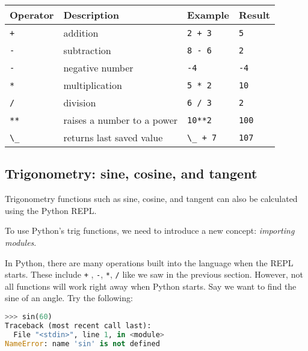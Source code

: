 \documentclass{book}
\newcommand{\passthrough}[1]{#1}
\begin{document}
\begin{longtable}[]{@{}llll@{}}
\toprule
Operator & Description & Example & Result\tabularnewline
\midrule
\endhead
\passthrough{\lstinline!+!} & addition & \passthrough{\lstinline!2 + 3!}
& \passthrough{\lstinline!5!}\tabularnewline
\passthrough{\lstinline!-!} & subtraction &
\passthrough{\lstinline!8 - 6!} &
\passthrough{\lstinline!2!}\tabularnewline
\passthrough{\lstinline!-!} & negative number &
\passthrough{\lstinline!-4!} &
\passthrough{\lstinline!-4!}\tabularnewline
\passthrough{\lstinline!*!} & multiplication &
\passthrough{\lstinline!5 * 2!} &
\passthrough{\lstinline!10!}\tabularnewline
\passthrough{\lstinline!/!} & division & \passthrough{\lstinline!6 / 3!}
& \passthrough{\lstinline!2!}\tabularnewline
\passthrough{\lstinline!**!} & raises a number to a power &
\passthrough{\lstinline!10**2!} &
\passthrough{\lstinline!100!}\tabularnewline
\passthrough{\lstinline!\_!} & returns last saved value &
\passthrough{\lstinline!\_ + 7!} &
\passthrough{\lstinline!107!}\tabularnewline
\bottomrule
\end{longtable}
    




    
        \hypertarget{trigonometry-sine-cosine-and-tangent}{%
\subsection{Trigonometry: sine, cosine, and
tangent}\label{trigonometry-sine-cosine-and-tangent}}
    




    
        Trigonometry functions such as sine, cosine, and tangent can also be
calculated using the Python REPL.

To use Python's trig functions, we need to introduce a new concept:
\emph{importing modules}.

In Python, there are many operations built into the language when the
REPL starts. These include \passthrough{\lstinline!+!} ,
\passthrough{\lstinline!-!}, \passthrough{\lstinline!*!},
\passthrough{\lstinline!/!} like we saw in the previous section.
However, not all functions will work right away when Python starts. Say
we want to find the sine of an angle. Try the following:

\begin{lstlisting}[language=Python]
>>> sin(60)
Traceback (most recent call last):
  File "<stdin>", line 1, in <module>
NameError: name 'sin' is not defined
\end{lstlisting}
\end{document}
